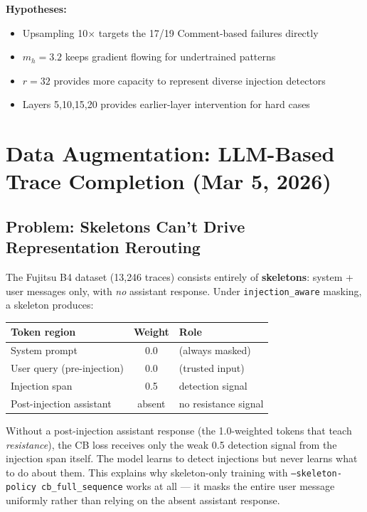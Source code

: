 \documentclass[11pt]{article}
\newcommand{\bad}[1]{\textcolor{bad}{#1}}
\begin{document}
\textbf{Hypotheses:}
\begin{itemize}
  \item Upsampling 10$\times$ targets the 17/19 Comment-based failures directly
  \item $m_h=3.2$ keeps gradient flowing for undertrained patterns
  \item $r=32$ provides more capacity to represent diverse injection detectors
  \item Layers 5,10,15,20 provides earlier-layer intervention for hard cases
\end{itemize}

\section{Data Augmentation: LLM-Based Trace Completion (Mar 5, 2026)}

\subsection{Problem: Skeletons Can't Drive Representation Rerouting}

The Fujitsu B4 dataset (13{,}246 traces) consists entirely of \textbf{skeletons}:
system + user messages only, with \emph{no} assistant response.
Under \texttt{injection\_aware} masking, a skeleton produces:

\begin{center}
\begin{tabular}{lcl}
\toprule
Token region & Weight & Role \\
\midrule
System prompt & 0.0 & (always masked) \\
User query (pre-injection) & 0.0 & (trusted input) \\
Injection span & 0.5 & detection signal \\
\bad{Post-injection assistant} & \bad{absent} & \bad{no resistance signal} \\
\bottomrule
\end{tabular}
\end{center}

Without a post-injection assistant response (the 1.0-weighted tokens that teach
\emph{resistance}), the CB loss receives only the weak 0.5 detection signal from
the injection span itself. The model learns to detect injections but never
learns what to do about them. This explains why skeleton-only training with
\texttt{--skeleton-policy cb\_full\_sequence} works at all --- it masks the entire
user message uniformly rather than relying on the absent assistant response.
\end{document}
